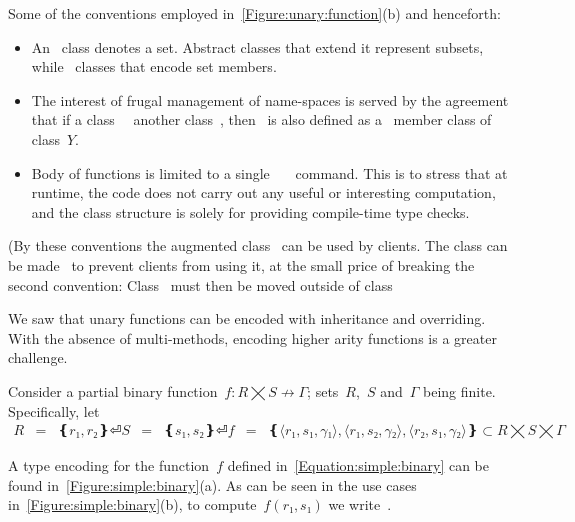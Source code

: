 Some of the conventions employed in~\cref{Figure:unary:function}(b) and henceforth:
\begin{itemize}
  \item An~ class denotes a set. Abstract classes that extend it represent
      subsets, while~ classes that encode set members.
  \item The interest of frugal management of name-spaces is served by the agreement that if
    a class~~ another class~, then~ is also defined
    as a~ member class of class~$Y$.
  \item Body of functions is limited to a single~~~\cc{;} command.  
      This is to stress that at runtime, the code does not carry out any useful or interesting computation,
      and the class structure is solely for providing compile-time type checks.
\end{itemize}
(By these conventions the augmented class~ can be used by clients.
The class can be made~ to prevent clients from using it,
  at the small price of breaking the second convention:
  Class~ must then be moved outside of class~

We saw that unary functions can be encoded with inheritance and overriding.
With the absence of multi-methods, encoding higher arity functions is a greater challenge.

Consider a partial binary function~$f: R⨉S↛Γ$; sets~$R$,~$S$ and~$Γ$ being finite.
Specifically, let
\begin{equation}
  \label{Equation:simple:binary}
  \begin{array}{rcl}
    R & = & ❴ r₁, r₂❵⏎
    S & = & ❴ s₁, s₂❵⏎
    f & = & ❴ ⟨r₁, s₁,γ₁⟩, ⟨r₁, s₂,γ₂⟩, ⟨r₂, s₁,γ₂⟩ ❵ ⊂ R⨉S⨉Γ
  \end{array}
\end{equation}

A \Java type encoding for the function~$f$ defined in~\cref{Equation:simple:binary}
  can be found in~\cref{Figure:simple:binary}(a).
As can be seen in the use cases in~\cref{Figure:simple:binary}(b),
  to compute~$f(r₁,s₁)$ we write~.

